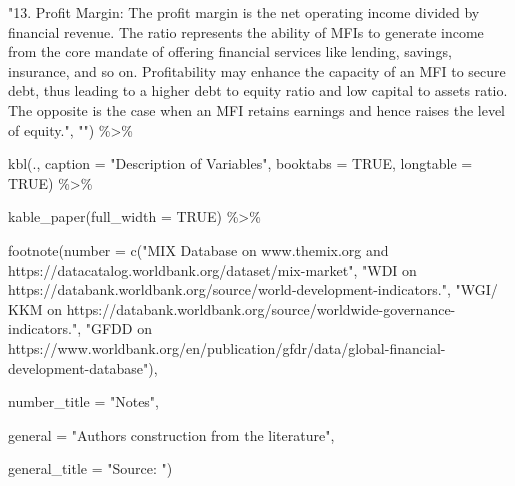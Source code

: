 \documentclass[a4paper,nobind]{templates/ociamthesis}
\newenvironment{Shaded}{\begin{snugshade}}{\end{snugshade}}
\newcommand{\AttributeTok}[1]{\textcolor[rgb]{0.77,0.63,0.00}{#1}}
\newcommand{\ConstantTok}[1]{\textcolor[rgb]{0.00,0.00,0.00}{#1}}
\newcommand{\FunctionTok}[1]{\textcolor[rgb]{0.00,0.00,0.00}{#1}}
\newcommand{\NormalTok}[1]{#1}
\newcommand{\SpecialCharTok}[1]{\textcolor[rgb]{0.00,0.00,0.00}{#1}}
\newcommand{\StringTok}[1]{\textcolor[rgb]{0.31,0.60,0.02}{#1}}
\renewenvironment{Shaded}
{
  \vspace{10pt}%
  \begin{snugshade}%
}{%
  \end{snugshade}%
  \vspace{8pt}%
}
\begin{document}
\begin{Shaded}
\begin{Highlighting}[]
\StringTok{"13. Profit Margin: The profit margin is the net operating income divided by financial revenue. The ratio represents the ability of MFIs to generate income from the core mandate of offering financial services like lending, savings, insurance, and so on. Profitability may enhance the capacity of an MFI to secure debt, thus leading to a higher debt to equity ratio and low capital to assets ratio. The opposite is the case when an MFI retains earnings and hence raises the level of equity."}\NormalTok{, }\StringTok{""}\NormalTok{) }\SpecialCharTok{\%\textgreater{}\%} 
  
  \FunctionTok{kbl}\NormalTok{(., }\AttributeTok{caption =} \StringTok{"Description of Variables"}\NormalTok{, }\AttributeTok{booktabs =} \ConstantTok{TRUE}\NormalTok{, }\AttributeTok{longtable =} \ConstantTok{TRUE}\NormalTok{) }\SpecialCharTok{\%\textgreater{}\%} 
  
  \FunctionTok{kable\_paper}\NormalTok{(}\AttributeTok{full\_width =} \ConstantTok{TRUE}\NormalTok{) }\SpecialCharTok{\%\textgreater{}\%} 
  
  \FunctionTok{footnote}\NormalTok{(}\AttributeTok{number =} \FunctionTok{c}\NormalTok{(}\StringTok{"MIX Database on www.themix.org and https://datacatalog.worldbank.org/dataset/mix{-}market"}\NormalTok{, }\StringTok{"WDI on https://databank.worldbank.org/source/world{-}development{-}indicators."}\NormalTok{, }\StringTok{"WGI/ KKM on https://databank.worldbank.org/source/worldwide{-}governance{-}indicators."}\NormalTok{, }\StringTok{"GFDD on https://www.worldbank.org/en/publication/gfdr/data/global{-}financial{-}development{-}database"}\NormalTok{), }
           
           \AttributeTok{number\_title =} \StringTok{"Notes"}\NormalTok{,}
    
           \AttributeTok{general =} \StringTok{"Authors\textquotesingle{} construction from the literature"}\NormalTok{,}
           
           \AttributeTok{general\_title =} \StringTok{"Source: "}\NormalTok{)}
\end{Highlighting}
\end{Shaded}
\end{document}
